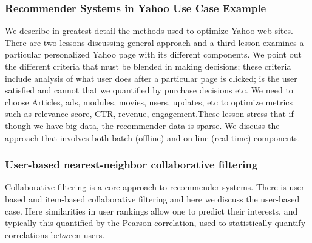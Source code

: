 

\subsubsection{Recommender Systems in Yahoo Use Case
Example}

We describe in greatest detail the methods used to optimize Yahoo web
sites. There are two lessons discussing general approach and a third
lesson examines a particular personalized Yahoo page with its different
components. We point out the different criteria that must be blended in
making decisions; these criteria include analysis of what user does
after a particular page is clicked; is the user satisfied and cannot
that we quantified by purchase decisions etc. We need to choose
Articles, ads, modules, movies, users, updates, etc to optimize metrics
such as relevance score, CTR, revenue, engagement.These lesson stress
that if though we have big data, the recommender data is sparse. We
discuss the approach that involves both batch (offline) and on-line
(real time) components.





\subsubsection{User-based nearest-neighbor collaborative filtering}

Collaborative filtering is a core approach to recommender systems. There
is user-based and item-based collaborative filtering and here we discuss
the user-based case. Here similarities in user rankings allow one to
predict their interests, and typically this quantified by the Pearson
correlation, used to statistically quantify correlations between users.




